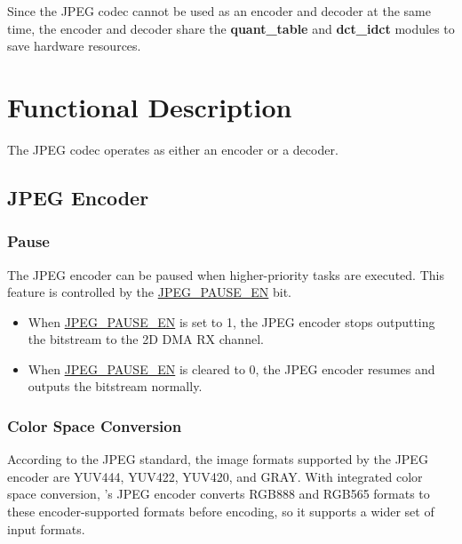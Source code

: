 \documentclass[main\_\_EN.tex]{subfiles}
\begin{document}
Since the JPEG codec cannot be used as an encoder and decoder at the same time, the encoder and decoder share the \textbf{quant\_table} and \textbf{dct\_idct} modules to save hardware resources.



\section{Functional Description}
\label{sec:jpegcodec-func-descr}

The JPEG codec operates as either an encoder or a decoder.

\subsection{JPEG Encoder}
\label{sec:jpegcodec-enc-mode}

\subsubsection{Pause}
\label{sec:jpegcodec-enc-pause}

The JPEG encoder can be paused when higher-priority tasks are executed. This feature is controlled by the \hyperref[fielddesc:JPEGPAUSEEN]{JPEG\_PAUSE\_EN} bit.

\begin{itemize}
    \item When \hyperref[fielddesc:JPEGPAUSEEN]{JPEG\_PAUSE\_EN} is set to 1, the JPEG encoder stops outputting the bitstream to the 2D DMA RX channel.
    \item When \hyperref[fielddesc:JPEGPAUSEEN]{JPEG\_PAUSE\_EN} is cleared to 0, the JPEG encoder resumes and outputs the bitstream normally.
\end{itemize}

\subsubsection{Color Space Conversion}
\label{sec:jpegcodec-enc-csc}

According to the JPEG standard, the image formats supported by the JPEG encoder are YUV444, YUV422, YUV420, and GRAY. With integrated color space conversion, \chipname{}'s JPEG encoder converts RGB888 and RGB565 formats to these encoder-supported formats before encoding, so it supports a wider set of input formats.
\end{document}
